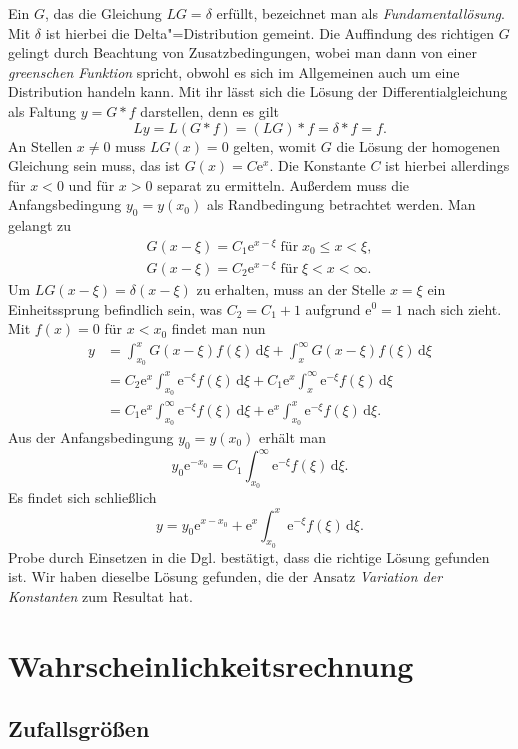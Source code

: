 \documentclass[paper=180mm:225mm,pagesize=auto,fleqn,twoside,11pt,dvipdfmx]{scrartcl}
\theoremstyle{rmbox}
\newcommand{\ee}{\mathrm{e}}
\begin{document}
Ein $G$, das die Gleichung $LG = \delta$ erfüllt, bezeichnet man als
\emph{Fundamentallösung}. Mit $\delta$ ist hierbei die
Delta"=Distribution gemeint. Die Auffindung des richtigen
$G$ gelingt durch Beachtung von Zusatzbedingungen, wobei man dann
von einer \emph{greenschen Funktion} spricht, obwohl es sich im
Allgemeinen auch um eine Distribution handeln kann. Mit ihr lässt sich
die Lösung der Differentialgleichung als Faltung $y = G*f$ darstellen,
denn es gilt
\[Ly = L(G*f) = (LG)*f = \delta*f = f.\]
An Stellen $x\ne 0$ muss $LG(x) = 0$ gelten, womit $G$ die Lösung der
homogenen Gleichung sein muss, das ist $G(x)=C\ee^x$. Die Konstante $C$
ist hierbei allerdings für $x<0$ und für $x>0$ separat zu ermitteln.
Außerdem muss die Anfangsbedingung $y_0=y(x_0)$ als Randbedingung
betrachtet werden. Man gelangt zu
\begin{gather*}
G(x-\xi) = C_1\ee^{x-\xi}\;\text{für}\; x_0\le x<\xi,\\
G(x-\xi) = C_2\ee^{x-\xi}\;\text{für}\; \xi < x < \infty.
\end{gather*}
Um $LG(x-\xi)=\delta(x-\xi)$ zu erhalten, muss an der Stelle $x=\xi$ ein
Einheitssprung befindlich sein, was $C_2 = C_1 + 1$ aufgrund
$\ee^0=1$ nach sich zieht. Mit $f(x)=0$ für $x<x_0$ findet man nun
\begin{align*}
y &= \int_{x_0}^x G(x-\xi)f(\xi)\,\mathrm d\xi + \int_x^\infty G(x-\xi)f(\xi)\,\mathrm d\xi\\
&= C_2\ee^x\int_{x_0}^x \ee^{-\xi} f(\xi)\,\mathrm d\xi + C_1\ee^x\int_x^\infty \ee^{-\xi}f(\xi)\,\mathrm d\xi\\
&= C_1\ee^x\int_{x_0}^\infty \ee^{-\xi} f(\xi)\,\mathrm d\xi + \ee^x\int_{x_0}^x\ee^{-\xi} f(\xi)\,\mathrm d\xi.
\end{align*}
Aus der Anfangsbedingung $y_0=y(x_0)$ erhält man
\[y_0\ee^{-x_0} = C_1\int_{x_0}^\infty \ee^{-\xi} f(\xi)\,\mathrm d\xi.\]
Es findet sich schließlich
\[y = y_0\ee^{x-x_0} + \ee^x\int_{x_0}^x \ee^{-\xi}f(\xi)\,\mathrm d\xi.\]
Probe durch Einsetzen in die Dgl. bestätigt, dass die richtige
Lösung gefunden ist. Wir haben dieselbe Lösung gefunden, die der
Ansatz \emph{Variation der Konstanten} zum Resultat hat.

\clearpage
\section{Wahrscheinlichkeitsrechnung}

\subsection{Zufallsgrößen}
\end{document}
